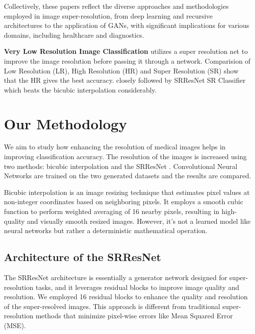 \documentclass[10pt,twocolumn,letterpaper]{article}
\begin{document}
Collectively, these papers reflect the diverse approaches and methodologies employed in image super-resolution, from deep learning and recursive architectures to the application of GANs, with significant implications for various domains, including healthcare and diagnostics.

\textbf{Very Low Resolution Image Classification}\cite{vest2017very} utilizes a super resolution net to improve the image resolution before passing it through a network. Comparision of Low Resolution (LR), High Resolution (HR) and Super Resolution (SR) show that the HR gives the best accuracy. closely followed by SRResNet \cite{ledig2017photo} SR Classifier which beats the bicubic interpolation considerably.


\section{Our Methodology}
We aim to study how enhancing the resolution of medical images helps in improving classification accuracy. 
The resolution of the images is increased using two methods: bicubic interpolation and the SRResNet \cite{ledig2017photo}. Convolutional Neural Networks are trained on the two generated datasets and the results are compared. 

Bicubic interpolation is an image resizing technique that estimates pixel values at non-integer coordinates based on neighboring pixels. It employs a smooth cubic function to perform weighted averaging of 16 nearby pixels, resulting in high-quality and visually smooth resized images. However, it's not a learned model like neural networks but rather a deterministic mathematical operation.

\subsection{Architecture of the SRResNet}
The SRResNet \cite{ledig2017photo} architecture is essentially a generator network designed for super-resolution tasks, and it leverages residual blocks to improve image quality and resolution. We employed 16 residual blocks to enhance the quality and resolution of the super-resolved images. This approach is different from traditional super-resolution methods that minimize pixel-wise errors like Mean Squared Error (MSE).
\end{document}
